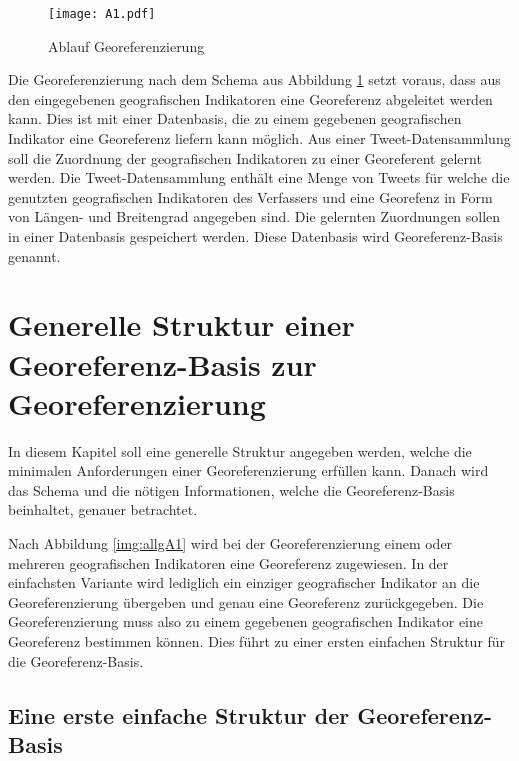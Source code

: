 		\begin{figure}[h!]
			\begin{center}
				\texttt{[image: A1.pdf]}
				\caption{Ablauf Georeferenzierung}
				\label{img:georef}
			\end{center}
		\end{figure}	

		Die Georeferenzierung nach dem Schema aus Abbildung \ref{img:georef} setzt voraus, dass aus den eingegebenen geografischen Indikatoren eine Georeferenz abgeleitet werden kann.     
		Dies ist mit einer Datenbasis, die zu einem gegebenen geografischen Indikator eine Georeferenz liefern kann möglich.
		Aus einer Tweet-Datensammlung soll die Zuordnung der geografischen Indikatoren zu einer Georeferent gelernt werden.
		Die Tweet-Datensammlung enthält eine Menge von Tweets für welche die genutzten geografischen Indikatoren des Verfassers und eine Georefenz in Form von Längen- und Breitengrad angegeben sind.
		Die gelernten Zuordnungen sollen in einer Datenbasis gespeichert werden.
		Diese Datenbasis wird Georeferenz-Basis genannt.


	\section{Generelle Struktur einer Georeferenz-Basis zur Georeferenzierung} \label{sec:generelleStruktur} 

		In diesem Kapitel soll eine generelle Struktur angegeben werden, welche die minimalen Anforderungen einer Georeferenzierung erfüllen kann.
		Danach wird das Schema und die nötigen Informationen, welche die Georeferenz-Basis beinhaltet, genauer betrachtet.
		
		Nach Abbildung \ref{img:allgA1} wird bei der Georeferenzierung einem oder mehreren geografischen Indikatoren eine Georeferenz zugewiesen.
		In der einfachsten Variante wird lediglich ein einziger geografischer Indikator an die Georeferenzierung übergeben und genau eine Georeferenz zurückgegeben.
		Die Georeferenzierung muss also zu einem gegebenen geografischen Indikator eine Georeferenz bestimmen können.
		Dies führt zu einer ersten einfachen Struktur für die Georeferenz-Basis.	

		\subsection*{Eine erste einfache Struktur der Georeferenz-Basis} 

